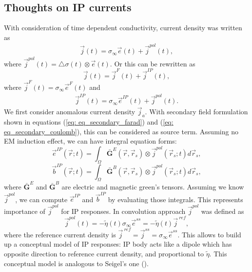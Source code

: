\documentclass[a4paper, 11pt]{article}
\newcommand{\siginf}{\sigma_\infty}
\newcommand{\dsig}{\triangle\sigma}
\renewcommand {\j}  { {\vec j} }
\renewcommand {\b}  { {\vec b} }
\newcommand {\e}  { {\vec e} }
\newcommand{\peta}{\tilde{\eta}}
\begin{document}
\subsection{Thoughts on IP currents}
With consideration of time dependent conductivity, current density was written as
\begin{eqnarray*}
    \j(t) = \siginf\e(t)+\j^{pol}(t),
\end{eqnarray*}
where $\j^{pol}(t)=\dsig(t)\otimes\e(t)$. Or this can be rewritten as
\begin{equation*}
    \j(t) = \j^{F}(t) + \j^{IP}(t),
\end{equation*}
where $\j^{F}(t)=\siginf\e^{F}(t)$ and
\begin{eqnarray}
		\j^{IP}(t) = \siginf\e^{IP}(t) + \j^{pol}(t).
        \label{eq: jip_with_ja}
\end{eqnarray}
We first consider anomalous current density $\j_a$. With secondary field formulation shown in equations (\ref{eq: eq_secondary_farad}) and (\ref{eq: eq_secondary_coulomb}), this can be considered as source term. Assuming no EM induction effect, we can have integral equation forms:
\begin{equation}
    \e^{IP}(\vec{r}; t) = \int_{\Omega} \bar{\mathbf{G}}^{E}(\vec{r}, \vec{r}_s)\otimes\j^{pol}(\vec{r}_s; t) d\vec{r}_s,
\end{equation}
\begin{equation}
    \b^{IP}(\vec{r}; t) = \int_{\Omega} \bar{\mathbf{G}}^{B}(\vec{r}, \vec{r}_s)\otimes\j^{pol}(\vec{r}_s; t) d\vec{r}_s,
\end{equation}
where $\bar{\mathbf{G}}^{E}$ and $\bar{\mathbf{G}}^{B}$ are electric and magnetic green's tensors. Assuming we know $\j^{pol}$, we can compute $\e^{IP}$ and $\b^{IP}$ by evaluating those integrals. This represents importance of  $\j^{pol}$ for IP responses. In convolution approach $\j^{pol}$ was defined as
\begin{equation}
    \j^{pol}(t) = -\peta(t)\siginf\e^{ss}=-\peta(t)\j^{\ ref},
\end{equation}
where the reference current density is $\j^{\ ref} = \j^{ss} = \siginf\e^{ss}$.
This allows to build up a conceptual model of IP responses: IP body acts like a dipole which has opposite direction to reference current density, and proportional to $\peta$. This conceptual model is analogous to Seigel's one (\cite{seigel1959}).
\end{document}
